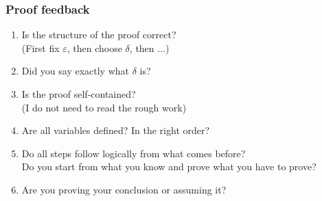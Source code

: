 \documentclass[14pt]{beamer}
\begin{document}
	\begin{frame}[t]
		\frametitle{Proof feedback}

		\begin{enumerate}
			\item Is the structure of the proof correct? \\ (First fix $\varepsilon$,
				then choose $\delta$, then ...)

			\item Did you say exactly what $\delta$ is?

			\item Is the proof self-contained? \\ (I do not need to read the rough work)

			\item Are all variables defined? In the right order?

			\item Do all steps follow logically from what comes before? \\ Do you
				start from what you know and prove what you have to prove? \\

			\item Are you proving your conclusion or assuming it?
		\end{enumerate}
	\end{frame}
\end{document}
